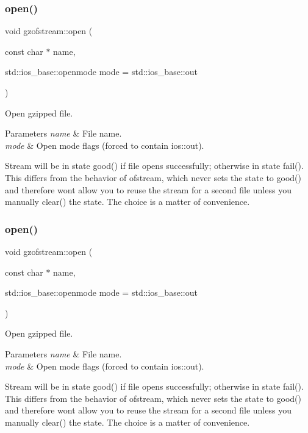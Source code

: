 \subsubsection{\texorpdfstring{open()}{open()}\hspace{0.1cm}{\footnotesize\ttfamily [1/2]}}
{\footnotesize\ttfamily void gzofstream\+::open (\begin{DoxyParamCaption}\item[{const char $\ast$}]{name,  }\item[{std\+::ios\+\_\+base\+::openmode}]{mode = {\ttfamily std\+:\+:ios\+\_\+base\+:\+:out} }\end{DoxyParamCaption})}



Open gzipped file. 


\begin{DoxyParams}{Parameters}
{\em name} & File name. \\
\hline
{\em mode} & Open mode flags (forced to contain ios\+::out).\\
\hline
\end{DoxyParams}
Stream will be in state good() if file opens successfully; otherwise in state fail(). This differs from the behavior of ofstream, which never sets the state to good() and therefore won\textquotesingle{}t allow you to reuse the stream for a second file unless you manually clear() the state. The choice is a matter of convenience. \mbox{\label{classgzofstream_aee3eb31f07eda7f5ad1f60d59ea4b239}} 
\subsubsection{\texorpdfstring{open()}{open()}\hspace{0.1cm}{\footnotesize\ttfamily [2/2]}}
{\footnotesize\ttfamily void gzofstream\+::open (\begin{DoxyParamCaption}\item[{const char $\ast$}]{name,  }\item[{std\+::ios\+\_\+base\+::openmode}]{mode = {\ttfamily std\+:\+:ios\+\_\+base\+:\+:out} }\end{DoxyParamCaption})}



Open gzipped file. 


\begin{DoxyParams}{Parameters}
{\em name} & File name. \\
\hline
{\em mode} & Open mode flags (forced to contain ios\+::out).\\
\hline
\end{DoxyParams}
Stream will be in state good() if file opens successfully; otherwise in state fail(). This differs from the behavior of ofstream, which never sets the state to good() and therefore won\textquotesingle{}t allow you to reuse the stream for a second file unless you manually clear() the state. The choice is a matter of convenience. 

